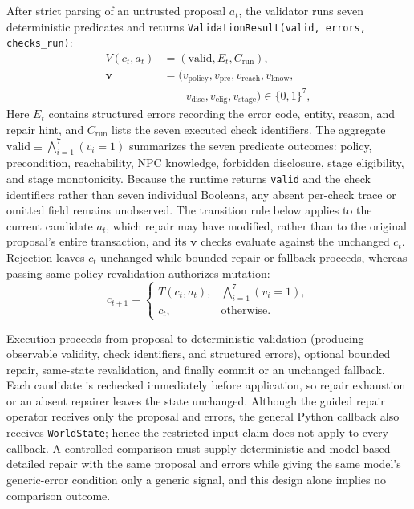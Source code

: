 \documentclass[journal]{IEEEtran}
\begin{document}
After strict parsing of an untrusted proposal $a_t$, the validator runs seven deterministic predicates and returns \texttt{ValidationResult(valid, errors, checks\_run)}:
\begin{equation}
\begin{aligned}
V(c_t,a_t)&=(\mathrm{valid},E_t,C_{\mathrm{run}}),\\
\boldsymbol{v}&=(v_{\mathrm{policy}},v_{\mathrm{pre}},v_{\mathrm{reach}},v_{\mathrm{know}},\\
&\qquad v_{\mathrm{disc}},v_{\mathrm{elig}},v_{\mathrm{stage}})\in\{0,1\}^{7},
\end{aligned}
\end{equation}
Here $E_t$ contains structured errors recording the error code, entity, reason, and repair hint, and $C_{\mathrm{run}}$ lists the seven executed check identifiers. The aggregate $\mathrm{valid}\equiv\bigwedge_{i=1}^{7}(v_i=1)$ summarizes the seven predicate outcomes: policy, precondition, reachability, NPC knowledge, forbidden disclosure, stage eligibility, and stage monotonicity. Because the runtime returns \texttt{valid} and the check identifiers rather than seven individual Booleans, any absent per-check trace or omitted field remains unobserved. The transition rule below applies to the current candidate $a_t$, which repair may have modified, rather than to the original proposal's entire transaction, and its $\boldsymbol{v}$ checks evaluate against the unchanged $c_t$. Rejection leaves $c_t$ unchanged while bounded repair or fallback proceeds, whereas passing same-policy revalidation authorizes mutation:
\begin{equation}
c_{t+1}=\begin{cases}
T(c_t,a_t), & \bigwedge_{i=1}^{7}(v_i=1),\\
c_t, & \text{otherwise.}
\end{cases}
\label{eq:transition}
\end{equation}

Execution proceeds from proposal to deterministic validation (producing observable validity, check identifiers, and structured errors), optional bounded repair, same-state revalidation, and finally commit or an unchanged fallback. Each candidate is rechecked immediately before application, so repair exhaustion or an absent repairer leaves the state unchanged. Although the guided repair operator receives only the proposal and errors, the general Python callback also receives \texttt{WorldState}; hence the restricted-input claim does not apply to every callback. A controlled comparison must supply deterministic and model-based detailed repair with the same proposal and errors while giving the same model's generic-error condition only a generic signal, and this design alone implies no comparison outcome.
\end{document}

